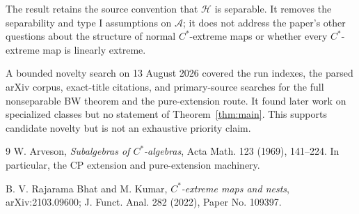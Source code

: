 \documentclass[11pt]{article}
\newcommand{\A}{\mathcal A}
\newcommand{\Hh}{\mathcal H}
\begin{document}
The result retains the source convention that $\Hh$ is separable. It removes the
separability and type I assumptions on $\A$; it does not address the paper's other
questions about the structure of normal $C^*$-extreme maps or whether every
$C^*$-extreme map is linearly extreme.

A bounded novelty search on 13 August 2026 covered the run indexes, the parsed
arXiv corpus, exact-title citations, and primary-source searches for the full
nonseparable BW theorem and the pure-extension route. It found later work on
specialized classes but no statement of Theorem~\ref{thm:main}. This supports
candidate novelty but is not an exhaustive priority claim.

\begin{thebibliography}{9}
W. Arveson, \emph{Subalgebras of $C^*$-algebras}, Acta Math. 123 (1969),
141--224. In particular, the CP extension and pure-extension machinery.

B. V. Rajarama Bhat and M. Kumar, \emph{$C^*$-extreme maps and nests},
arXiv:2103.09600; J. Funct. Anal. 282 (2022), Paper No. 109397.
\end{thebibliography}
\end{document}

